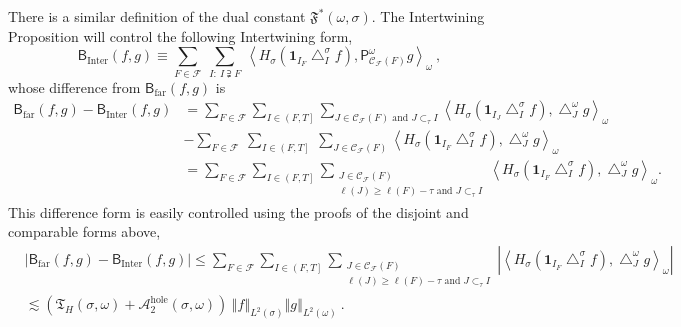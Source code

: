 \documentclass{amsart}%
\theoremstyle{plain}
\numberwithin{equation}{section}
\begin{document}
There is a similar definition of the dual constant $\mathfrak{F}^{\ast}\left(
\omega,\sigma\right)  $. The Intertwining Proposition will control the
following Intertwining form,%
\[
\mathsf{B}_{\operatorname{Inter}}\left(  f,g\right)  \equiv\sum_{F\in
\mathcal{F}}\ \sum_{I:\ I\supsetneqq F}\ \left\langle H_{\sigma}\left(
\mathbf{1}_{I_{F}}\bigtriangleup_{I}^{\sigma}f\right)  ,\mathsf{P}%
_{\mathcal{C}_{\mathcal{F}}\left(  F\right)  }^{\omega}g\right\rangle
_{\omega}\ ,
\]
whose difference from $\mathsf{B}_{\operatorname{far}}\left(  f,g\right)  $ is%
\begin{align*}
\mathsf{B}_{\operatorname{far}}\left(  f,g\right)  -\mathsf{B}%
_{\operatorname{Inter}}\left(  f,g\right)   & =\sum_{F\in\mathcal{F}}%
\sum_{I\in\left(  F,T\right]  }\sum_{J\in\mathcal{C}_{\mathcal{F}}\left(
F\right)  \text{ and }J\subset_{\tau}I}\left\langle H_{\sigma}\left(
\mathbf{1}_{I_{J}}\bigtriangleup_{I}^{\sigma}f\right)  ,\bigtriangleup
_{J}^{\omega}g\right\rangle _{\omega}\\
& -\sum_{F\in\mathcal{F}}\ \sum_{I\in\left(  F,T\right]  }\ \sum
_{J\in\mathcal{C}_{\mathcal{F}}\left(  F\right)  }\left\langle H_{\sigma
}\left(  \mathbf{1}_{I_{F}}\bigtriangleup_{I}^{\sigma}f\right)
,\bigtriangleup_{J}^{\omega}g\right\rangle _{\omega}\\
& =\sum_{F\in\mathcal{F}}\sum_{I\in\left(  F,T\right]  }\sum_{\substack{J\in
\mathcal{C}_{\mathcal{F}}\left(  F\right)  \\\ell\left(  J\right)  \geq
\ell\left(  F\right)  -\tau\text{ and }J\subset_{\tau}I}}\left\langle
H_{\sigma}\left(  \mathbf{1}_{I_{F}}\bigtriangleup_{I}^{\sigma}f\right)
,\bigtriangleup_{J}^{\omega}g\right\rangle _{\omega}.
\end{align*}
This difference form is easily controlled using the proofs of the disjoint and
comparable forms above,
\begin{align*}
& \left\vert \mathsf{B}_{\operatorname{far}}\left(  f,g\right)  -\mathsf{B}%
_{\operatorname{Inter}}\left(  f,g\right)  \right\vert \leq\sum_{F\in
\mathcal{F}}\sum_{I\in\left(  F,T\right]  }\sum_{\substack{J\in\mathcal{C}%
_{\mathcal{F}}\left(  F\right)  \\\ell\left(  J\right)  \geq\ell\left(
F\right)  -\tau\text{ and }J\subset_{\tau}I}}\left\vert \left\langle
H_{\sigma}\left(  \mathbf{1}_{I_{F}}\bigtriangleup_{I}^{\sigma}f\right)
,\bigtriangleup_{J}^{\omega}g\right\rangle _{\omega}\right\vert \\
& \lesssim\left(  \mathfrak{T}_{H}\left(  \sigma,\omega\right)  +\mathcal{A}%
_{2}^{\operatorname{hole}}\left(  \sigma,\omega\right)  \right)  \ \left\Vert
f\right\Vert _{L^{2}\left(  \sigma\right)  }\left\Vert g\right\Vert
_{L^{2}\left(  \omega\right)  }\ .
\end{align*}
\end{document}

